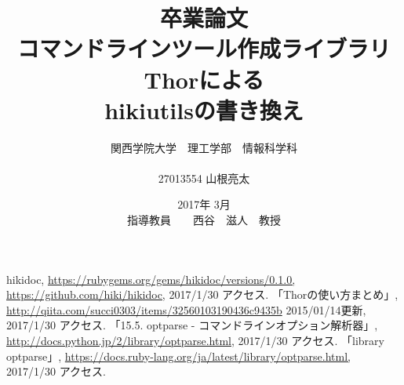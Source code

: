 \documentclass[12pt,a4paper]{jsarticle}
\begin{document}
\title{卒業論文\\
\vspace{4cm} コマンドラインツール作成ライブラリThorによる\\hikiutilsの書き換え}
\author{ 関西学院大学　理工学部　情報科学科\\\\27013554 山根亮太}
\date{\vspace{3cm} 2017年  3月\\
\vspace{3cm} 指導教員　　西谷　滋人　教授}
\maketitle
\setcounter{tocdepth}{4}

\tableofcontents






\begin{thebibliography}{99}
   hikidoc, \url{https://rubygems.org/gems/hikidoc/versions/0.1.0,} \url{https://github.com/hiki/hikidoc,} 2017/1/30 アクセス.
   「Thorの使い方まとめ」, \url{http://qiita.com/succi0303/items/32560103190436c9435b} 2015/01/14更新, 2017/1/30 アクセス.
   「15.5. optparse - コマンドラインオプション解析器」, \url{http://docs.python.jp/2/library/optparse.html,} 2017/1/30 アクセス.
   「library optparse」, \url{https://docs.ruby-lang.org/ja/latest/library/optparse.html,} 2017/1/30 アクセス.
\end{thebibliography}
\end{document}
